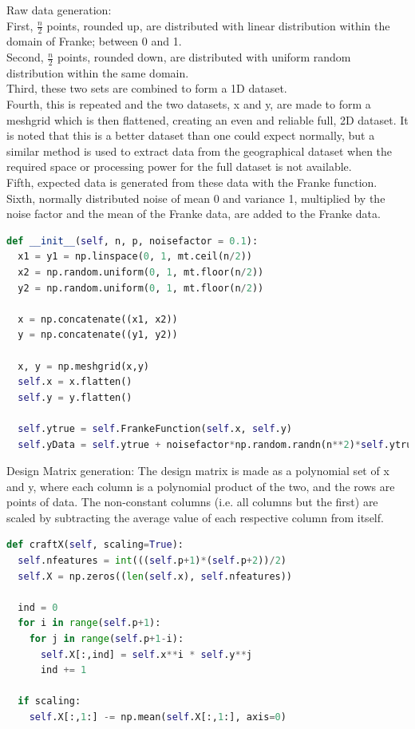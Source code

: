 \documentclass[a4paper, UKenglish]{article}
\newcommand{\0}{\mathbf{0}}
\newcommand{\1}{\mathbf{1}}
\begin{document}
Raw data generation:
\\First, $\frac{n}{2}$ points, rounded up, are distributed with linear distribution within the domain of Franke; between 0 and 1. 
\\Second, $\frac{n}{2}$ points, rounded down, are distributed with uniform random distribution within the same domain. 
\\Third, these two sets are combined to form a 1D dataset. 
\\Fourth, this is repeated and the two datasets, x and y, are made to form a meshgrid which is then flattened, creating an even and reliable full, 2D dataset. It is noted that this is a better dataset than one could expect normally, but a similar method is used to extract data from the geographical dataset when the required space or processing power  for the full dataset is not available. 
\\Fifth, expected data is generated  from these data with the Franke function. 
\\Sixth, normally distributed noise of mean 0 and variance 1, multiplied by the noise factor and the mean of the Franke data, are added to the Franke data.

\begin{lstlisting}[language=Python]
def __init__(self, n, p, noisefactor = 0.1):
  x1 = y1 = np.linspace(0, 1, mt.ceil(n/2))
  x2 = np.random.uniform(0, 1, mt.floor(n/2))
  y2 = np.random.uniform(0, 1, mt.floor(n/2))
  
  x = np.concatenate((x1, x2))
  y = np.concatenate((y1, y2))
  
  x, y = np.meshgrid(x,y)
  self.x = x.flatten()
  self.y = y.flatten()
  
  self.ytrue = self.FrankeFunction(self.x, self.y)
  self.yData = self.ytrue + noisefactor*np.random.randn(n**2)*self.ytrue.mean()
\end{lstlisting}

Design Matrix generation:
The design matrix is made as a polynomial set of x and y, where each column is a polynomial product of the two, and the rows are points of data. The non-constant columns (i.e. all columns but the first) are scaled by subtracting the average value of each respective column from itself.

\begin{lstlisting}[language=python]
def craftX(self, scaling=True):
  self.nfeatures = int(((self.p+1)*(self.p+2))/2)
  self.X = np.zeros((len(self.x), self.nfeatures))

  ind = 0
  for i in range(self.p+1):
    for j in range(self.p+1-i):
      self.X[:,ind] = self.x**i * self.y**j
      ind += 1

  if scaling:
    self.X[:,1:] -= np.mean(self.X[:,1:], axis=0)
\end{lstlisting}
\end{document}
